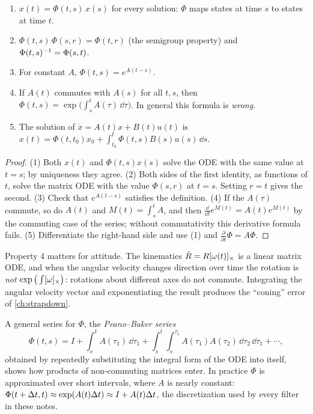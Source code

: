 \begin{proposition}
\label{prop:stm}
\begin{enumerate}
  \item $x(t) = \Phi(t, s)\,x(s)$ for every solution: $\Phi$ maps states at time $s$ to states at time $t$.
  \item $\Phi(t, s)\,\Phi(s, r) = \Phi(t, r)$ (the semigroup property) and $\Phi(t, s)^{-1} = \Phi(s, t)$.
  \item For constant $A$, $\Phi(t, s) = e^{A(t - s)}$.
  \item If $A(t)$ commutes with $A(s)$ for all $t, s$, then $\Phi(t, s) = \exp\big(\int_s^tA(\tau)\,\dd\tau\big)$. In general this formula is
        \emph{wrong}.
  \item The solution of $\dot x = A(t)x + B(t)u(t)$ is $x(t) = \Phi(t, t_0)x_0 + \int_{t_0}^t\Phi(t, s)B(s)u(s)\,\dd s$.
\end{enumerate}
\end{proposition}
\begin{proof}
(1) Both $x(t)$ and $\Phi(t, s)x(s)$ solve the ODE with the same value at $t = s$; by uniqueness they agree. (2) Both sides of the first
identity, as functions of $t$, solve the matrix ODE with the value $\Phi(s, r)$ at $t = s$. Setting $r = t$ gives the second. (3) Check that
$e^{A(t-s)}$ satisfies the definition. (4) If the $A(\tau)$ commute, so do $A(t)$ and $M(t) = \int_s^tA$, and then
$\frac{\dd}{\dd t}e^{M(t)} = A(t)e^{M(t)}$ by the commuting case of the series; without commutativity this derivative formula fails.
(5) Differentiate the right-hand side and use (1) and $\frac{\partial}{\partial t}\Phi = A\Phi$.
\end{proof}

Property 4 matters for attitude. The kinematics $\dot R = R[\omega(t)]_{\times}$ is a linear matrix ODE, and when the angular velocity changes
direction over time the rotation is \emph{not} $\exp\big(\int[\omega]_{\times}\big)$: rotations about different axes do not commute. Integrating
the angular velocity vector and exponentiating the result produces the ``coning'' error of \cref{ch:strapdown}.

A general series for $\Phi$, the \emph{Peano--Baker series}
\begin{equation*}
  \Phi(t,s) = I + \int_s^tA(\tau_1)\,\dd\tau_1 + \int_s^t\int_s^{\tau_1}A(\tau_1)A(\tau_2)\,\dd\tau_2\,\dd\tau_1 + \cdots,
\end{equation*}
obtained by repeatedly substituting the integral form of the ODE into itself, shows how products of non-commuting matrices enter. In practice $\Phi$ is approximated over short
intervals, where $A$ is nearly constant: $\Phi(t + {\Delta t}, t) \approx \exp(A(t){\Delta t}) \approx I + A(t){\Delta t}$, the discretization used by every
filter in these notes.

